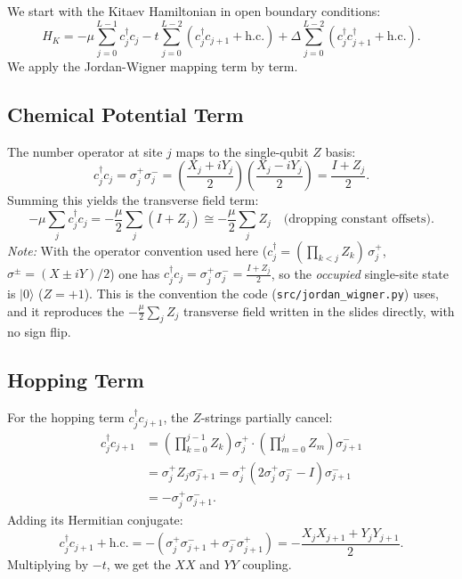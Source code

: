 \documentclass[11pt]{article}
\begin{document}
We start with the Kitaev Hamiltonian in open boundary conditions:
\begin{equation}
  H_K = -\mu \sum_{j=0}^{L-1} c_j^\dagger c_j - t \sum_{j=0}^{L-2} (c_j^\dagger c_{j+1} + \text{h.c.}) + \Delta \sum_{j=0}^{L-2} (c_j^\dagger c_{j+1}^\dagger + \text{h.c.}).
\end{equation}
We apply the Jordan-Wigner mapping term by term.

\subsection{Chemical Potential Term}
The number operator at site $j$ maps to the single-qubit $Z$ basis:
\begin{equation}
  c_j^\dagger c_j = \sigma_j^+ \sigma_j^- = \left( \frac{X_j + iY_j}{2} \right) \left( \frac{X_j - iY_j}{2} \right) = \frac{I + Z_j}{2}.
\end{equation}
Summing this yields the transverse field term:
\begin{equation}
  -\mu \sum_j c_j^\dagger c_j = -\frac{\mu}{2} \sum_j (I + Z_j) \cong -\frac{\mu}{2} \sum_j Z_j \quad \text{(dropping constant offsets)}.
\end{equation}
\textit{Note:} With the operator convention used here ($c_j^\dagger = (\prod_{k<j} Z_k)\,\sigma_j^+$, $\sigma^\pm=(X\pm iY)/2$) one has $c_j^\dagger c_j = \sigma_j^+\sigma_j^- = \frac{I + Z_j}{2}$, so the \emph{occupied} single-site state is $|0\rangle$ ($Z=+1$). This is the convention the code (\texttt{src/jordan\_wigner.py}) uses, and it reproduces the $-\frac{\mu}{2}\sum_j Z_j$ transverse field written in the slides directly, with no sign flip.

\subsection{Hopping Term}
For the hopping term $c_j^\dagger c_{j+1}$, the $Z$-strings partially cancel:
\begin{align*}
  c_j^\dagger c_{j+1} 
  &= \left( \prod_{k=0}^{j-1} Z_k \right) \sigma_j^+ \cdot \left( \prod_{m=0}^{j} Z_m \right) \sigma_{j+1}^- \\
  &= \sigma_j^+ Z_j \sigma_{j+1}^- = \sigma_j^+ (2\sigma_j^+ \sigma_j^- - I) \sigma_{j+1}^- \\
  &= - \sigma_j^+ \sigma_{j+1}^-.
\end{align*}
Adding its Hermitian conjugate:
\begin{equation}
  c_j^\dagger c_{j+1} + \text{h.c.} = - (\sigma_j^+ \sigma_{j+1}^- + \sigma_j^- \sigma_{j+1}^+) = - \frac{X_j X_{j+1} + Y_j Y_{j+1}}{2}.
\end{equation}
Multiplying by $-t$, we get the $XX$ and $YY$ coupling.
\end{document}
